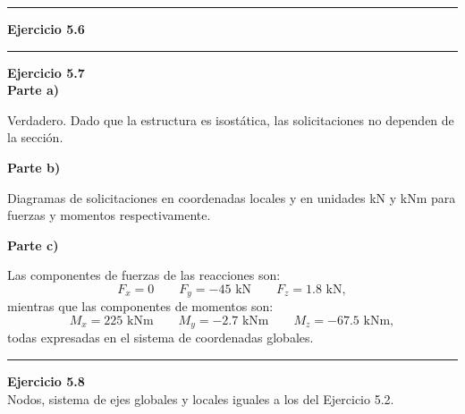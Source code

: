 \hrule
\vspace{5mm}
\textbf{Ejercicio 5.6}\\

\begin{center}
	\def\svgwidth{0.8\textwidth}
	
\end{center}






\hrule
\vspace{5mm}
\textbf{Ejercicio 5.7}\\



\textbf{Parte a)}

Verdadero. Dado que la estructura es isostática, las solicitaciones no dependen de la  sección.

\vspace{5mm}

\textbf{Parte b)}

Diagramas de solicitaciones en coordenadas locales y en unidades kN y kNm para fuerzas y momentos respectivamente.


\begin{center}
	\def\svgwidth{0.65\textwidth}
	
\end{center}

\vspace{5mm}

\textbf{Parte c)}

Las componentes de fuerzas de las reacciones son:
$$
F_x = 0 \qquad F_y = -45 \text{ kN} \qquad F_z = 1.8 \text{ kN},
$$
%
mientras que las componentes de momentos son:
$$
M_x = 225  \text{ kNm} \qquad M_y = -2.7 \text{ kNm} \qquad M_z = -67.5 \text{ kNm},
$$
%
todas expresadas en el sistema de coordenadas globales.











\hrule 
\vspace{5mm}
\textbf{Ejercicio 5.8}\\

Nodos, sistema de ejes globales y locales iguales a los del Ejercicio 5.2.



